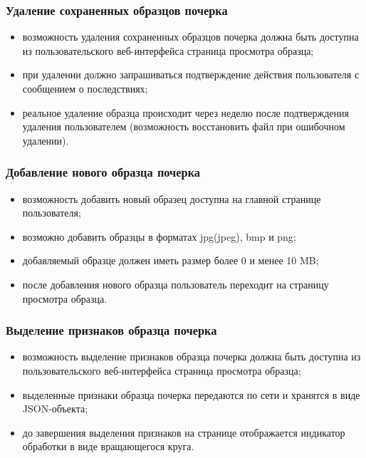 \subsubsection{Удаление сохраненных образцов почерка}
\label{sec:freq:delete}
\begin{itemize}
	\item возможность удаления сохраненных образцов почерка должна быть доступна из пользовательского веб-интерфейса страница просмотра образца;
	\item при удалении должно запрашиваться подтверждение действия пользователя с сообщением о последствиях;
	\item реальное удаление образца происходит через неделю после подтверждения удаления пользователем (возможность восстановить файл при ошибочном удалении).
\end{itemize}

\subsubsection{Добавление нового образца почерка}
\label{sec:freq:add}
\begin{itemize}
	\item возможность добавить новый образец доступна на главной странице пользователя;
	\item возможно добавить образцы в форматах jpg(jpeg), bmp и png;
	\item добавляемый образце должен иметь размер более 0 и менее 10 MB;
	\item после добавления нового образца пользователь переходит на страницу просмотра образца.
\end{itemize}

\subsubsection{Выделение признаков образца почерка}
\label{sec:freq:extract_features}
\begin{itemize}
	\item возможность выделение признаков образца почерка должна быть доступна из пользовательского веб-интерфейса страница просмотра образца;
	\item выделенные признаки образца почерка передаются по сети и хранятся в виде JSON-объекта;
	\item до завершения выделения признаков на странице отображается индикатор обработки в виде вращающегося круга.
\end{itemize}

